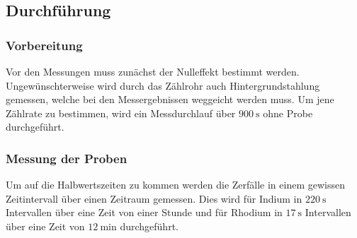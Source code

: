 \subsection{Durchführung}
\label{sec:durchführung}

\subsubsection{Vorbereitung}
Vor den Messungen muss zunächst der Nulleffekt bestimmt werden.
Ungewünschterweise wird durch das Zählrohr auch Hintergrundstahlung gemessen, welche bei den Messergebnissen weggeicht werden muss.
Um jene Zählrate zu bestimmen, wird ein Messdurchlauf über $\SI{900}{\second}$ ohne Probe durchgeführt.

\subsubsection{Messung der Proben}
Um auf die Halbwertszeiten zu kommen werden die Zerfälle in einem gewissen Zeitintervall über einen Zeitraum gemessen.
Dies wird für Indium in $\SI{220}{\second}$ Intervallen über eine Zeit von einer Stunde und für Rhodium in $\SI{17}{\second}$ Intervallen über eine Zeit von $\SI{12}{\minute}$ durchgeführt.
